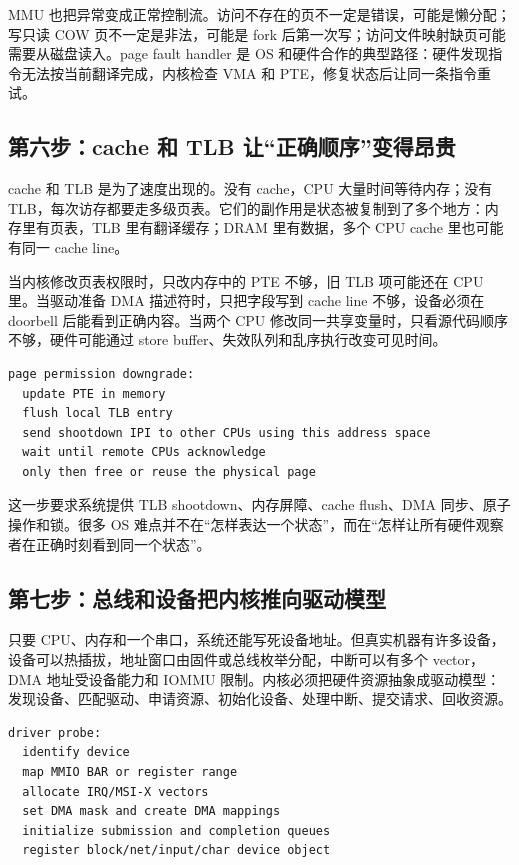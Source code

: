 MMU 也把异常变成正常控制流。访问不存在的页不一定是错误，可能是懒分配；写只读 COW 页不一定是非法，可能是 fork 后第一次写；访问文件映射缺页可能需要从磁盘读入。page fault handler 是 OS 和硬件合作的典型路径：硬件发现指令无法按当前翻译完成，内核检查 VMA 和 PTE，修复状态后让同一条指令重试。

\subsection{第六步：cache 和 TLB 让“正确顺序”变得昂贵}

cache 和 TLB 是为了速度出现的。没有 cache，CPU 大量时间等待内存；没有 TLB，每次访存都要走多级页表。它们的副作用是状态被复制到了多个地方：内存里有页表，TLB 里有翻译缓存；DRAM 里有数据，多个 CPU cache 里也可能有同一 cache line。

当内核修改页表权限时，只改内存中的 PTE 不够，旧 TLB 项可能还在 CPU 里。当驱动准备 DMA 描述符时，只把字段写到 cache line 不够，设备必须在 doorbell 后能看到正确内容。当两个 CPU 修改同一共享变量时，只看源代码顺序不够，硬件可能通过 store buffer、失效队列和乱序执行改变可见时间。

\begin{lstlisting}
page permission downgrade:
  update PTE in memory
  flush local TLB entry
  send shootdown IPI to other CPUs using this address space
  wait until remote CPUs acknowledge
  only then free or reuse the physical page
\end{lstlisting}

这一步要求系统提供 TLB shootdown、内存屏障、cache flush、DMA 同步、原子操作和锁。很多 OS 难点并不在“怎样表达一个状态”，而在“怎样让所有硬件观察者在正确时刻看到同一个状态”。

\subsection{第七步：总线和设备把内核推向驱动模型}

只要 CPU、内存和一个串口，系统还能写死设备地址。但真实机器有许多设备，设备可以热插拔，地址窗口由固件或总线枚举分配，中断可以有多个 vector，DMA 地址受设备能力和 IOMMU 限制。内核必须把硬件资源抽象成驱动模型：发现设备、匹配驱动、申请资源、初始化设备、处理中断、提交请求、回收资源。

\begin{lstlisting}
driver probe:
  identify device
  map MMIO BAR or register range
  allocate IRQ/MSI-X vectors
  set DMA mask and create DMA mappings
  initialize submission and completion queues
  register block/net/input/char device object
\end{lstlisting}

